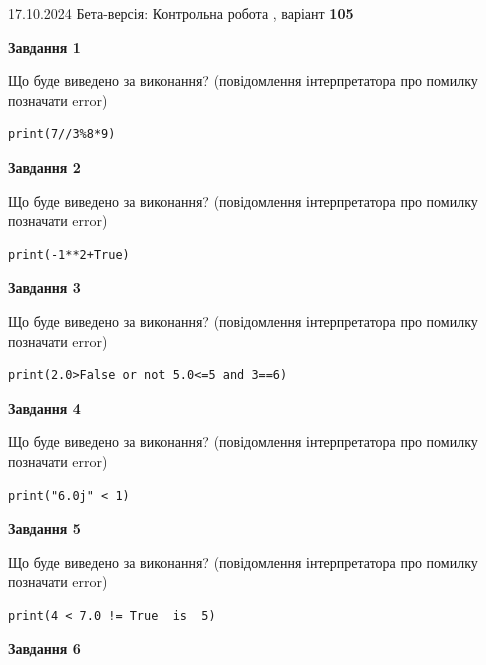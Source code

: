 \documentclass[12pt, ukrainian]{article}
\begin{document}
{\Large{17.10.2024 Бета-версія: Контрольна робота , варіант  \No \textbf { 105 }\par}}
{
\begin {large}
{\begin {center}\textbf{Завдання 1}\end {center}}

Що буде виведено за виконання? (повідомлення інтерпретатора про помилку позначати error)\par
\begin{verbatim}
print(7//3%8*9)
\end{verbatim}

{\begin {center}\textbf{Завдання 2}\end {center}}

Що буде виведено за виконання? (повідомлення інтерпретатора про помилку позначати error)\par
\begin{verbatim}
print(-1**2+True)
\end{verbatim}

{\begin {center}\textbf{Завдання 3}\end {center}}

Що буде виведено за виконання? (повідомлення інтерпретатора про помилку позначати error)\par
\begin{verbatim}
print(2.0>False or not 5.0<=5 and 3==6)
\end{verbatim}

{\begin {center}\textbf{Завдання 4}\end {center}}

Що буде виведено за виконання? (повідомлення інтерпретатора про помилку позначати error)\par
\begin{verbatim}
print("6.0j" < 1)
\end{verbatim}

{\begin {center}\textbf{Завдання 5}\end {center}}

Що буде виведено за виконання? (повідомлення інтерпретатора про помилку позначати error)\par
\begin{verbatim}
print(4 < 7.0 != True  is  5)
\end{verbatim}

{\begin {center}\textbf{Завдання 6}\end {center}}


\end{large}}
\end{document}
